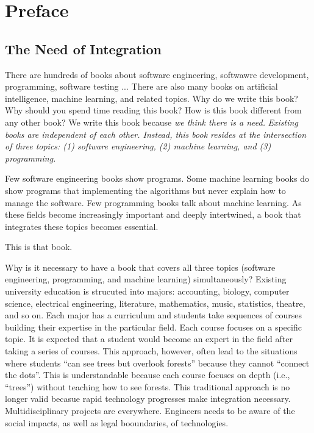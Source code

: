 \chapter*{Preface}

\section*{The Need of Integration}

There are hundreds of books about software engineering, softwawre
development, programming, software testing ...  There are also many
books on artificial intelligence, machine learning, and related
topics.  Why do we write this book?  Why should you spend time reading
this book?  How is this book different from any other book?  We write
this book because {\it we think there is a need.}  {\it Existing books
  are independent of each other.  Instead, this book resides at the
  intersection of three topics: (1) software engineering, (2) machine
  learning, and (3) programming.  }


Few software engineering books show programs. Some machine learning
books do show programs that implementing the algorithms but never
explain how to manage the software.  Few programming books talk about
machine learning.  As these fields become increasingly important and
deeply intertwined, a book that integrates these topics becomes
essential.

This is that book.

Why is it necessary to have a book that covers all three topics
(software engineering, programming, and machine learning)
simultaneously?  Existing university education is strucuted into
majors: accounting, biology, computer science, electrical engineering,
literature, mathematics, music, statistics, theatre, and so on.  Each
major has a curriculum and students take sequences of courses building
their expertise in the particular field. Each course focuses on a
specific topic.  It is expected that a student would become an expert
in the field after taking a series of courses.  This approach,
however, often lead to the situations where students ``can see trees but
overlook forests'' because they cannot ``connect the dots''.  This is
understandable because each course focuses on depth (i.e., ``trees'')
without teaching how to see forests.  This traditional approach is
no longer valid becasue rapid technology progresses make integration
necessary.
Multidisciplinary projects are everywhere. Engineers needs to be aware
of the social impacts, as well as legal booundaries, of technologies.

